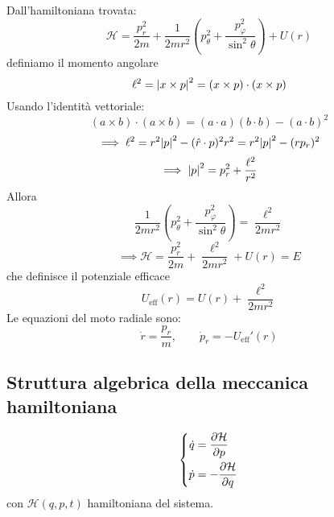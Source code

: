 \begin{example}
    Dall’hamiltoniana trovata:
    \begin{equation}
        \mathcal{H}= \frac{p_r^2}{2m}+ \frac{1}{2mr^2}\left(p_\theta^2+ \frac{p_\varphi^2}{\sin^2\theta}\right)+ U(r)
    \end{equation}
    definiamo il momento angolare
    \begin{equation}
        \ell^2= \abs{x\times p}^2= (x\times p)\cdot(x\times p)
    \end{equation}
    Usando l’identità vettoriale:
    \begin{equation}
        (a\times b)\cdot(a\times b)= (a\cdot a)(b\cdot b)- (a\cdot b)^2
    \end{equation}
    \begin{equation}
       \implies \ell^2= r^2\abs{p}^2-(\hat{r}\cdot p)^2 r^2= r^2\abs{p}^2- (rp_r)^2
    \end{equation}
    \begin{equation}
        \implies\abs{p}^2= p_r^2+ \frac{\ell^2}{r^2}
    \end{equation}
    Allora
    \begin{equation}
        \frac{1}{2mr^2}\left(p_\theta^2+ \frac{p_\varphi^2}{\sin^2\theta}\right)= \frac{\ell^2}{2mr^2}
    \end{equation}
    \begin{equation}
        \implies \mathcal{H}= \frac{p_r^2}{2m}+ \frac{\ell^2}{2mr^2}+ U(r)=E
    \end{equation}
    che definisce il potenziale efficace
    \begin{equation}
        U_\text{eff}(r)= U(r)+ \frac{\ell^2}{2mr^2}
    \end{equation}
    Le equazioni del moto radiale sono:
    \begin{equation}
        \dot{r}= \frac{p_r}{m}, \qquad \dot{p}_r= -U_\text{eff}'(r)
    \end{equation}
\end{example}


\subsection{Struttura algebrica della meccanica hamiltoniana}

\begin{equation}
    \left\{
        \begin{aligned}
            \dot{q}&= \pdv{\mathcal{H}}{p}\\
            \dot{p}&= -\pdv{\mathcal{H}}{q}
        \end{aligned}
    \right.
\end{equation}
con $\mathcal{H}(q,p,t)$ hamiltoniana del sistema.

